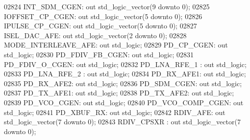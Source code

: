 \begin{DoxyCode}
02824     INT\_SDM\_CGEN:   \textcolor{keywordflow}{out} \textcolor{comment}{std\_logic\_vector}(\textcolor{vhdllogic}{}\textcolor{vhdllogic}{9} \textcolor{keywordflow}{downto} \textcolor{vhdllogic}{}\textcolor{vhdllogic}{0});
02825     IOFFSET\_CP\_CGEN:    \textcolor{keywordflow}{out} \textcolor{comment}{std\_logic\_vector}(\textcolor{vhdllogic}{}\textcolor{vhdllogic}{5} \textcolor{keywordflow}{downto} \textcolor{vhdllogic}{}\textcolor{vhdllogic}{0});
02826     IPULSE\_CP\_CGEN: \textcolor{keywordflow}{out} \textcolor{comment}{std\_logic\_vector}(\textcolor{vhdllogic}{}\textcolor{vhdllogic}{5} \textcolor{keywordflow}{downto} \textcolor{vhdllogic}{}\textcolor{vhdllogic}{0});
02827     ISEL\_DAC\_AFE:   \textcolor{keywordflow}{out} \textcolor{comment}{std\_logic\_vector}(\textcolor{vhdllogic}{}\textcolor{vhdllogic}{2} \textcolor{keywordflow}{downto} \textcolor{vhdllogic}{}\textcolor{vhdllogic}{0});
02828     MODE\_INTERLEAVE\_AFE:    \textcolor{keywordflow}{out} \textcolor{comment}{std\_logic};
02829     PD\_CP\_CGEN: \textcolor{keywordflow}{out} \textcolor{comment}{std\_logic};
02830     PD\_FDIV\_FB\_CGEN:    \textcolor{keywordflow}{out} \textcolor{comment}{std\_logic};
02831     PD\_FDIV\_O\_CGEN: \textcolor{keywordflow}{out} \textcolor{comment}{std\_logic};
02832     PD\_LNA\_RFE\_1    : \textcolor{keywordflow}{out} \textcolor{comment}{std\_logic};
02833     PD\_LNA\_RFE\_2    : \textcolor{keywordflow}{out} \textcolor{comment}{std\_logic};
02834     PD\_RX\_AFE1: \textcolor{keywordflow}{out} \textcolor{comment}{std\_logic};
02835     PD\_RX\_AFE2: \textcolor{keywordflow}{out} \textcolor{comment}{std\_logic};
02836     PD\_SDM\_CGEN:    \textcolor{keywordflow}{out} \textcolor{comment}{std\_logic};
02837     PD\_TX\_AFE1: \textcolor{keywordflow}{out} \textcolor{comment}{std\_logic};
02838     PD\_TX\_AFE2: \textcolor{keywordflow}{out} \textcolor{comment}{std\_logic};
02839     PD\_VCO\_CGEN:    \textcolor{keywordflow}{out} \textcolor{comment}{std\_logic};
02840     PD\_VCO\_COMP\_CGEN:   \textcolor{keywordflow}{out} \textcolor{comment}{std\_logic};
02841     PD\_XBUF\_RX: \textcolor{keywordflow}{out} \textcolor{comment}{std\_logic};
02842     RDIV\_AFE:   \textcolor{keywordflow}{out} \textcolor{comment}{std\_logic\_vector}(\textcolor{vhdllogic}{}\textcolor{vhdllogic}{7} \textcolor{keywordflow}{downto} \textcolor{vhdllogic}{}\textcolor{vhdllogic}{0});
02843     RDIV\_CPSXR :    \textcolor{keywordflow}{out} \textcolor{comment}{std\_logic\_vector}(\textcolor{vhdllogic}{}\textcolor{vhdllogic}{7} \textcolor{keywordflow}{downto} \textcolor{vhdllogic}{}\textcolor{vhdllogic}{0});

\end{DoxyCode}
